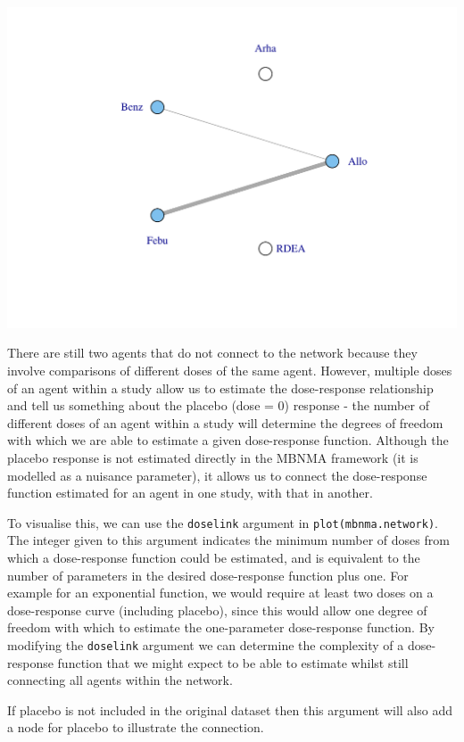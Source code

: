 \documentclass[]{article}
\begin{document}
\includegraphics{mbnmadose_files/figure-latex/unnamed-chunk-29-1.pdf}

There are still two agents that do not connect to the network because
they involve comparisons of different doses of the same agent. However,
multiple doses of an agent within a study allow us to estimate the
dose-response relationship and tell us something about the placebo (dose
= 0) response - the number of different doses of an agent within a study
will determine the degrees of freedom with which we are able to estimate
a given dose-response function. Although the placebo response is not
estimated directly in the MBNMA framework (it is modelled as a nuisance
parameter), it allows us to connect the dose-response function estimated
for an agent in one study, with that in another.

To visualise this, we can use the \texttt{doselink} argument in
\texttt{plot(mbnma.network)}. The integer given to this argument
indicates the minimum number of doses from which a dose-response
function could be estimated, and is equivalent to the number of
parameters in the desired dose-response function plus one. For example
for an exponential function, we would require at least two doses on a
dose-response curve (including placebo), since this would allow one
degree of freedom with which to estimate the one-parameter dose-response
function. By modifying the \texttt{doselink} argument we can determine
the complexity of a dose-response function that we might expect to be
able to estimate whilst still connecting all agents within the network.

If placebo is not included in the original dataset then this argument
will also add a node for placebo to illustrate the connection.
\end{document}
